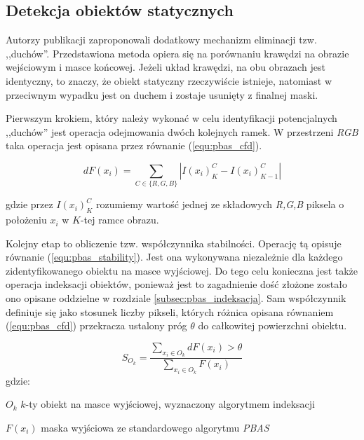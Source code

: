 \subsection{Detekcja obiektów statycznych}
\label{subsec:pbas_duchy}

Autorzy publikacji \cite{kryjak_14_pbas} zaproponowali dodatkowy mechanizm eliminacji tzw. ,,duchów''. Przedstawiona metoda opiera się na porównaniu krawędzi na obrazie wejściowym i masce końcowej. 
Jeżeli układ krawędzi, na obu obrazach jest identyczny, to znaczy, że obiekt statyczny rzeczywiście istnieje, natomiast w przeciwnym wypadku jest on duchem i zostaje usunięty z finalnej maski. 


Pierwszym krokiem, który należy wykonać w celu identyfikacji potencjalnych ,,duchów'' jest operacja odejmowania dwóch kolejnych ramek. 
W przestrzeni \textit{RGB} taka operacja jest opisana przez równanie (\ref{equ:pbas_cfd}).

    \begin{equation}
        dF(x_i) = \sum_{C \in \{R,G,B\}} | I(x_i)_{K}^C - I(x_i)_{K-1}^C |
    \label{equ:pbas_cfd}
    \end{equation}
    
\noindent gdzie przez $I(x_i)_{K}^C$ rozumiemy wartość jednej ze składowych \textit{R,G,B} piksela o położeniu $x_i$ w $K$-tej ramce obrazu.

Kolejny etap to obliczenie tzw. współczynnika stabilności. 
Operację tą opisuje równanie (\ref{equ:pbas_stability}). 
Jest ona wykonywana niezależnie dla każdego zidentyfikowanego obiektu na masce wyjściowej. 
Do tego celu konieczna jest także operacja indeksacji obiektów, ponieważ jest to zagadnienie dość złożone zostało ono opisane oddzielne w rozdziale \ref{subsec:pbas_indeksacja}. 
Sam współczynnik definiuje się jako stosunek liczby pikseli, których różnica opisana równaniem (\ref{equ:pbas_cfd}) przekracza ustalony próg $\theta$ do całkowitej powierzchni obiektu.

    \begin{equation}
        S_{O_k} = \frac{ \sum_{x_i \in O_k} dF(x_i) > \theta }{ \sum_{x_i \in O_k} F(x_i) }
    \label{equ:pbas_stability}
    \end{equation}
gdzie:
\begin{eqwhere}[2cm]
	\item[$O_k$] $k$-ty obiekt na masce wyjściowej, wyznaczony algorytmem indeksacji
	\item[$F(x_i)$] maska wyjściowa ze standardowego algorytmu \textit{PBAS}
\end{eqwhere}

